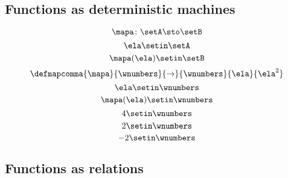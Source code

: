 {\begin{forslides}
        \subsection{Functions as deterministic machines}

        \begin{equation}
            \label{eq:slides_session2_94}
            \mapa\colon \setA \sto \setB
        \end{equation}
        \begin{equation}
            \label{eq:slides_session2_95}
            \ela \setin\setA
        \end{equation}
        \begin{equation}
            \label{eq:slides_session2_96}
            \mapa(\ela) \setin\setB
        \end{equation}
        \begin{equation}
            \label{eq:slides_session2_97}
            \defmapcomma{
                \mapa
            }{
                \wnumbers
            }{
                \to
            }{
                \wnumbers
            }{
                \ela
            }{
                \ela^2
            }
        \end{equation}
        \begin{equation}
            \label{eq:slides_session2_98}
            \ela \setin\wnumbers
        \end{equation}
        \begin{equation}
            \label{eq:slides_session2_99}
            \mapa(\ela) \setin\wnumbers
        \end{equation}
        \begin{equation}
            \label{eq:slides_session2_100}
            4 \setin\wnumbers
        \end{equation}
        \begin{equation}
            \label{eq:slides_session2_101}
            2 \setin\wnumbers
        \end{equation}
        \begin{equation}
            \label{eq:slides_session2_102}
            -2 \setin\wnumbers
        \end{equation}

        \subsection{Functions as relations}


\end{forslides}}
